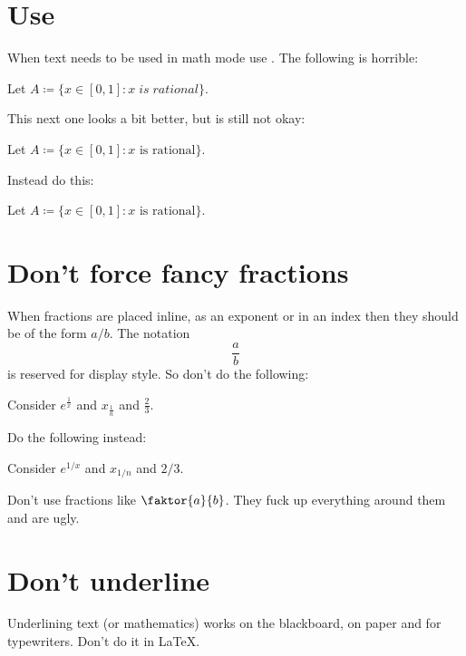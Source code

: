 \documentclass[a4paper, 10pt, abstract=on, headings=standardclasses]{scrartcl}
\begin{document}
\section{Use }

When text needs to be used in math mode use .
The following is horrible:
\begin{LTXexample}[pos = b]
  Let $A \coloneqq \{ x \in [0,1] : x \; is \; rational \}$.
\end{LTXexample}
This next one looks a bit better, but is still not okay:
\begin{LTXexample}[pos = b]
  Let $A \coloneqq \{ x \in [0,1] : x \text{ is rational} \}$.
\end{LTXexample}
Instead do this:
\begin{LTXexample}[pos = b]
  \newcommand{\defined}{\coloneqq}
  \newcommand{\sothat}{\mathrel{:}}
  Let $A \defined \{ x \in [0,1] \sothat \text{$x$ is rational} \}$.
\end{LTXexample}





\section{Don’t force fancy fractions}

When fractions are placed inline, as an exponent or in an index then they should be of the form $a/b$.
The notation
\[
  \frac{a}{b}
\]
is reserved for display style.
So don’t do the following:
\begin{LTXexample}[pos = r]
  Consider $e^{\frac{1}{x}}$ and $x_{\frac{1}{n}}$ and $\frac{2}{3}$.
\end{LTXexample}
Do the following instead:
\begin{LTXexample}[pos = r]
  Consider $e^{1/x}$ and $x_{1/n}$ and $2/3$.
\end{LTXexample}

Don’t use fractions like $\faktor{a}{b}$.
They fuck up everything around them and are ugly.





\section{Don’t underline}
Underlining text (or mathematics) works on the blackboard, on paper and for typewriters.
Don’t do it in \LaTeX.
\end{document}
